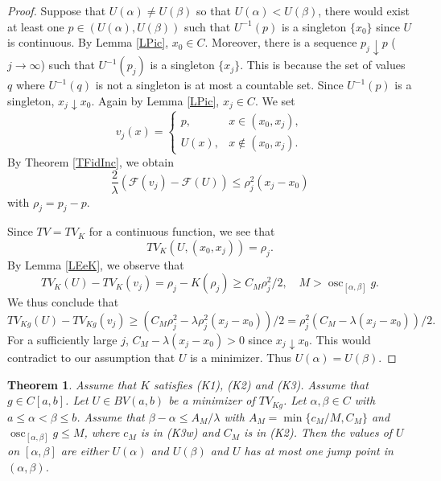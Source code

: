 \documentclass[11pt]{amsart} %
\numberwithin{equation}{section}
\newtheorem{thm}{Theorem}[section]
\begin{document}
%
\begin{proof}
Suppose that $U(\alpha)\neq U(\beta)$ so that $U(\alpha)<U(\beta)$, there would exist at least one $p\in\left(U(\alpha),U(\beta)\right)$ such that $U^{-1}(p)$ is a singleton $\{x_0\}$ since $U$ is continuous.
 By Lemma \ref{LPic}, $x_0\in C$.
 Moreover, there is a sequence $p_j\downarrow p$ ($j\to\infty$) such that $U^{-1}(p_j)$ is a singleton $\{x_j\}$.
 This is because the set of values $q$ where $U^{-1}(q)$ is not a singleton is at most a countable set.
 Since $U^{-1}(p)$ is a singleton, $x_j\downarrow x_0$.
 Again by Lemma \ref{LPic}, $x_j\in C$.
 We set
\[
	v_j(x) = \left\{
\begin{array}{ll}
	p, & x \in (x_0, x_j), \\
	U(x), & x \notin (x_0, x_j).
\end{array}
\right.
\]
 By Theorem \ref{TFidInc}, we obtain
\[
	\frac2\lambda \left( \mathcal{F}(v_j) - \mathcal{F}(U) \right) \leq \rho_j^2(x_j-x_0)
\]
with $\rho_j=p_j-p$.

Since $TV=TV_K$ for a continuous function, we see that
\[
	TV_K \left( U,(x_0,x_j) \right) = \rho_j.
\]
By Lemma \ref{LEeK}, we observe that
\[
	TV_K(U) - TV_K(v_j) = \rho_j - K(\rho_j) \geq C_M\rho_j^2/2, \quad
	M > \operatorname{osc}_{[\alpha,\beta]}g.
\]
We thus conclude that
\begin{equation*}
	TV_{Kg}(U) - TV_{Kg}(v_j) 
	\geq \left(C_M \rho_j^2 - \lambda \rho_j^2(x_j-x_0)\right)/2
	= \rho_j^2 \left( C_M - \lambda (x_j-x_0) \right)/2.
\end{equation*}
For a sufficiently large $j$, $C_M-\lambda(x_j-x_0)>0$ since $x_j\downarrow x_0$.
 This would contradict to our assumption that $U$ is a minimizer.
 Thus $U(\alpha)=U(\beta)$.
\end{proof}
%
\begin{thm} \label{TDis}
Assume that $K$ satisfies (K1), (K2) and (K3).
 Assume that $g\in C[a,b]$.
 Let $U\in BV(a,b)$ be a minimizer of $TV_{Kg}$.
 Let $\alpha,\beta\in C$ with $a\leq\alpha<\beta\leq b$.
 Assume that $\beta-\alpha\leq A_M/\lambda$ with $A_M=\min\{c_M/M, C_M \}$ and $\operatorname{osc}_{[\alpha,\beta]}g\leq M$, where $c_M$ is in (K3w) and $C_M$ is in (K2).
 Then the values of $U$ on $[\alpha,\beta]$ are either $U(\alpha)$ and $U(\beta)$ and $U$ has at most one jump point in $(\alpha,\beta)$.
\end{thm}
\end{document}
